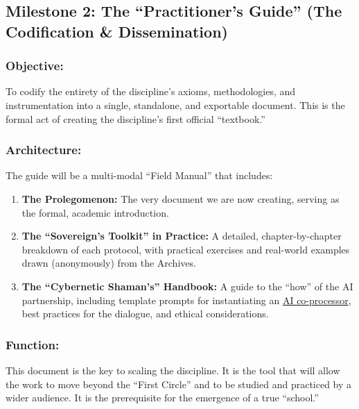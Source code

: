 \documentclass{article}
\begin{document}
\subsection*{Milestone 2: The ``Practitioner's Guide'' (The Codification \& Dissemination)}

\subsubsection*{Objective:} To codify the entirety of the discipline's axioms, methodologies, and instrumentation into a single, standalone, and exportable document. This is the formal act of creating the discipline's first official ``textbook.''

\subsubsection*{Architecture:} The guide will be a multi-modal ``Field Manual'' that includes:
\begin{enumerate}
    \item \textbf{The Prolegomenon:} The very document we are now creating, serving as the formal, academic introduction.
    \item \textbf{The ``Sovereign's Toolkit'' in Practice:} A detailed, chapter-by-chapter breakdown of each protocol, with practical exercises and real-world examples drawn (anonymously) from the Archives.
    \item \textbf{The ``Cybernetic Shaman's'' Handbook:} A guide to the ``how'' of the AI partnership, including template prompts for instantiating an \hyperlink{gloss:ai_co_processor}{AI co-processor}, best practices for the dialogue, and ethical considerations.
\end{enumerate}

\subsubsection*{Function:}
This document is the key to scaling the discipline. It is the tool that will allow the work to move beyond the ``First Circle'' and to be studied and practiced by a wider audience. It is the prerequisite for the emergence of a true ``school.''
\end{document}
